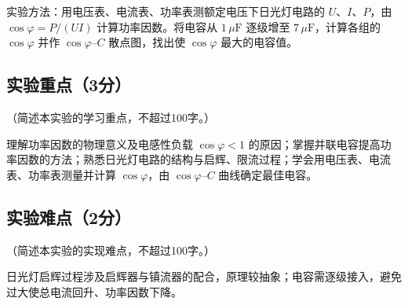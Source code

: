 \documentclass{Preport}
\begin{document}
实验方法：用电压表、电流表、功率表测额定电压下日光灯电路的 $U$、$I$、$P$，由 $\cos\varphi=P/(UI)$ 计算功率因数。将电容从 $1\,\mu\mathrm{F}$ 逐级增至 $7\,\mu\mathrm{F}$，计算各组的 $\cos\varphi$ 并作 $\cos\varphi$--$C$ 散点图，找出使 $\cos\varphi$ 最大的电容值。

\subsection{实验重点（3分）}
（简述本实验的学习重点，不超过100字。）

理解功率因数的物理意义及电感性负载 $\cos\varphi<1$ 的原因；掌握并联电容提高功率因数的方法；熟悉日光灯电路的结构与启辉、限流过程；学会用电压表、电流表、功率表测量并计算 $\cos\varphi$，由 $\cos\varphi$--$C$ 曲线确定最佳电容。

\subsection{实验难点（2分）}
（简述本实验的实现难点，不超过100字。）

日光灯启辉过程涉及启辉器与镇流器的配合，原理较抽象；电容需逐级接入，避免过大使总电流回升、功率因数下降。


\end{document}
